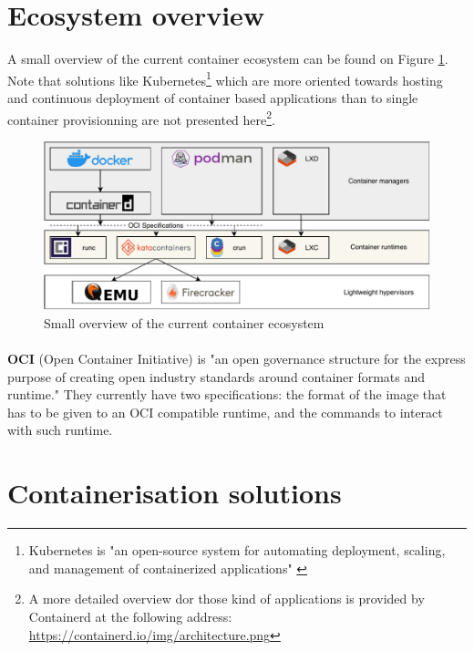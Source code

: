 \section{Ecosystem overview}
A small overview of the current container ecosystem can be found on Figure \ref{fig:overview}.  Note that solutions like Kubernetes\footnote{Kubernetes is "an open-source system for automating deployment, scaling, and management of containerized applications" \cite{kubernetes}} which are more oriented towards hosting and continuous deployment of container based applications than to single container provisionning are not presented here\footnote{A more detailed overview dor those kind of applications is provided by Containerd at the following address: \href{https://containerd.io/img/architecture.png}{https://containerd.io/img/architecture.png}}.
\begin{figure}[h!]
  \begin{center}
    \includegraphics[width=\linewidth]{images/ecosystem.pdf}
    \caption{Small overview of the current container ecosystem}
    \label{fig:overview}
  \end{center}
\end{figure}
\paragraph{}\textbf{OCI} (Open Container Initiative) is "an open governance structure for the express purpose of creating open industry standards around container formats and runtime."\cite{oci} They currently have two specifications: the format of the image that has to be given to an OCI compatible runtime, and the commands to interact with such runtime.

\section{Containerisation solutions}
